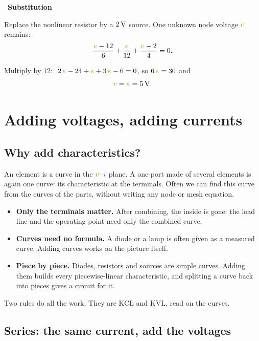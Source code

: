 \documentclass[11pt,a4paper]{article}
\newcommand{\Icol}[1]{\textcolor{ccur}{#1}}
\newcommand{\Vcol}[1]{\textcolor{cvolt}{#1}}
\newif\ifsolfirst
\newcommand{\solstep}[2]{\par\ifsolfirst\global\solfirstfalse\else\bigskip\needspace{5\baselineskip}\fi
  \noindent{\color{cpow}\bfseries Step #1.}\ {\bfseries #2}\par\nobreak\smallskip}
\newcommand{\ohm}{\,\Omega}
\newcommand{\e}[1]{\textcolor{cvolt}{e_{#1}}}
\newcommand{\gnd}[2]{\draw (#1,#2) -- ++(0,-0.2) node[ground] {};}
\newcommand{\lL}[3]{\node[anchor=east, xshift=-7pt, font=\small] at (#1,#2) {#3};}
\newcommand{\exTwo}[1]{%
  \draw (0,0) to[american voltage source, invert, l=$\Vcol{12\V}$] (0,2.2);
  \draw (0,2.2) to[R, l=$6\ohm$] (2.2,2.2) to[R, l=$4\ohm$] (4.4,2.2);
  \draw (0,2.2) -- (0,3.2) to[R, l=$8\ohm$] (4.4,3.2) -- (4.4,2.2);
  \draw (2.2,2.2) to[R] (2.2,0); \lL{2.2}{1.1}{$12\ohm$}
  \node[pol] at (2.55,1.6) {$+$}; \node[pol] at (2.55,0.55) {$-$};
  \node[font=\small, text=cvolt] at (2.6,1.07) {$v$};
  \draw (0,0) -- (4.4,0);
  \fill (2.2,2.2) circle (1.7pt); \fill (2.2,0) circle (1.7pt); \fill (0,2.2) circle (1.7pt);
  \ifcase#1
    \draw (4.4,2.2) to[generic] (4.4,0);
    \draw[iar] (4.75,1.55) -- (4.75,0.95); \node[font=\small, text=ccur, anchor=west] at (4.8,1.25) {$i_R$};
    \node[pol] at (4.05,1.55) {$+$}; \node[pol] at (4.05,0.45) {$-$};
    \node[font=\small, text=cvolt] at (3.98,1.0) {$v_R$};
    \fill (4.4,2.2) circle (1.7pt); \fill (4.4,0) circle (1.7pt);
  \or
    \draw (4.4,2.2) -- (5.4,2.2) node[ocirc] {} node[above, tlab] {a};
    \draw (4.4,0) -- (5.4,0) node[ocirc] {} node[below, tlab] {b};
    \fill (4.4,2.2) circle (1.7pt);
  \or
    \draw (4.4,0) to[american voltage source, invert, l_=$\Vcol{2\V}$] (4.4,2.2);
    \fill (4.4,2.2) circle (1.7pt); \fill (4.4,0) circle (1.7pt);
    \node[font=\small, text=cvolt, above] at (2.2,2.25) {$e$};
    \gnd{1.1}{0}
  \fi}
\begin{document}
\solstep{3}{Substitution}
\begin{minipage}[c]{0.56\linewidth}
\centering
{}
\end{minipage}\hfill
\begin{minipage}[c]{0.4\linewidth}
Replace the nonlinear resistor by a $2\,\mathrm{V}$ source. One unknown node voltage $\e{}$ remains:
\[
  \frac{\e{} - 12}{6} + \frac{\e{}}{12} + \frac{\e{} - 2}{4} = 0 .
\]
\end{minipage}

\smallskip
Multiply by $12$: $\ 2\,\e{} - 24 + \e{} + 3\,\e{} - 6 = 0$, so $6\,\e{} = 30$ and
\[
  \Vcol{v} = \e{} = 5\V .
\]

\section{Adding voltages, adding currents}\label{sec:add}

\subsection{Why add characteristics?}

An element is a curve in the $\Vcol{v}$--$\Icol{i}$ plane. A one-port made of several elements
is again one curve: its characteristic at the terminals. Often we can find this curve from the
curves of the parts, without writing any node or mesh equation.

\begin{itemize}[itemsep=3pt]
  \item \textbf{Only the terminals matter.} After combining, the inside is gone: the load line
        and the operating point need only the combined curve.
  \item \textbf{Curves need no formula.} A diode or a lamp is often given as a measured curve.
        Adding curves works on the picture itself.
  \item \textbf{Piece by piece.} Diodes, resistors and sources are simple curves. Adding them
        builds every piecewise-linear characteristic, and splitting a curve back into pieces
        gives a circuit for it.
\end{itemize}
Two rules do all the work. They are KCL and KVL, read on the curves.

\subsection{Series: the same current, add the voltages}
\end{document}
